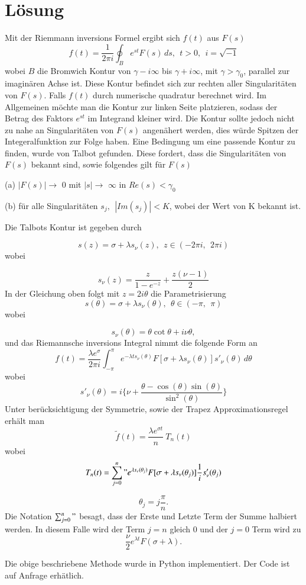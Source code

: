 %
%
%


\section{Lösung}
\label{laplace:section:Methode nach Talbot}
Mit der Riemmann inversions Formel ergibt sich $f(t)$ aus $F(s)$
\[
f(t) = \frac{1}{2\pi i} \oint_{B} e^{st}F(s)\,ds,~~t>0,~~i=\sqrt{-1}
\]
wobei $B$ die Bromwich Kontur von $\gamma-i\infty$ bis $\gamma+i\infty$, mit $\gamma>\gamma_{0}$, parallel zur imaginären Achse ist.
Diese Kontur befindet sich zur rechten aller Singularitäten von $F(s)$.
Falls $f(t)$ durch numerische quadratur berechnet wird.
Im Allgemeinen möchte man die Kontur zur linken Seite platzieren, sodass der Betrag des Faktors $e^{st}$ im Integrand kleiner wird. Die Kontur sollte jedoch nicht zu nahe an Singularitäten von $F(s)$ angenähert werden, dies würde Spitzen der Integeralfunktion zur Folge haben.
Eine Bedingung um eine passende Kontur zu finden, wurde von Talbot gefunden.
Diese fordert, dass die Singularitäten von $F(s)$ bekannt sind, sowie folgendes gilt für $F(s)$

(a) $|F(s)|\rightarrow$ 0 mit $|s|\rightarrow$ $\infty$ in $Re(s)<\gamma_{0}$

(b) für alle Singularitäten $s_{j},~~|Im(s_{j})|<K$, wobei der Wert von K bekannt ist.

Die Talbots Kontur ist gegeben durch

\[
s(z) = \sigma+\lambda s_{\nu}(z),~~ z\in (-2\pi i,~~2\pi i)
\]
wobei

\[
s_{\nu}(z)=\frac{z}{1-e^{-z}}+\frac{z(\nu-1)}{2}
\]
In der Gleichung oben folgt mit $z=2i\theta$ die Parametrisierung
\[
s(\theta) = \sigma+\lambda s_{\nu}(\theta),~~ \theta\in (-\pi ,~~\pi)
\]
wobei

\[
s_{\nu}(\theta)=\theta \cot\theta+i\nu\theta,
\]
und das Riemannsche inversions Integral nimmt die folgende Form an
\[
f(t)=\frac{\lambda e^{\sigma}}{2\pi i}\int_{-\pi}^{\pi} e^{-\lambda ts_{\nu}(\theta)}F[\sigma + \lambda s_{\nu}(\theta)]s'_{\nu}(\theta)\,d\theta
\]
wobei
\[
s'_{\nu}(\theta) = i \Biggl\{\nu + \frac{\theta-\cos(\theta)\sin(\theta)}{\sin^{2}(\theta)}  \Biggr\}
\]
Unter berücksichtigung der Symmetrie, sowie der Trapez Approximationsregel erhält man
\[
\tilde{f}(t) = \frac{\lambda e^{\sigma t}}{n}~T_{n}(t)
\]
wobei 
\[
T_{n}(t)=\sum_{j=0}^n " e^{\lambda s_{\nu}(\theta_{j})} F[\sigma + \lambda s_{\nu}(\theta_{j})] \frac{1}{i} s'_{\nu}(\theta_{j})
\]

\[
\theta_{j} = j \frac{\pi}{n}.
\]
Die Notation $\sum_{j=0}^n "$ besagt, dass der Erste und Letzte Term der Summe halbiert werden. In diesem Falle wird der Term $j=n$ gleich 0 und der $j=0$ Term wird zu
\[
\frac{\nu}{2}e^{\lambda t}F(\sigma + \lambda).
\]

Die obige beschriebene Methode wurde in Python implementiert.
Der Code ist auf Anfrage erhätlich.

